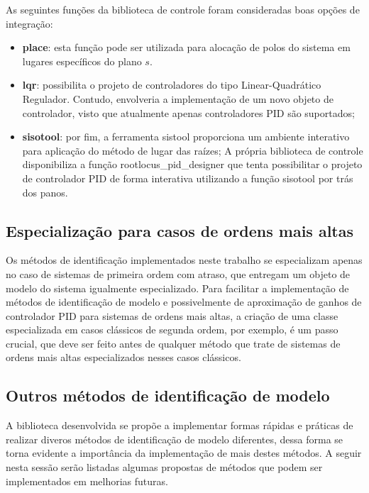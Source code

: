 As seguintes funções da biblioteca de controle foram consideradas boas opções de integração:
\begin{itemize}
    \item \textbf{place}: esta função pode ser utilizada para alocação de polos do sistema em lugares específicos do plano $s$.
    \item \textbf{lqr}: possibilita o projeto de controladores do tipo Linear-Quadrático Regulador.
    Contudo, envolveria a implementação de um novo objeto de controlador, visto que atualmente apenas controladores PID
    são suportados;
    \item \textbf{sisotool}: por fim, a ferramenta sistool proporciona um ambiente interativo para aplicação do método
    de lugar das raízes;
    A própria biblioteca de controle disponibiliza a função rootlocus\_pid\_designer que tenta possibilitar o projeto
    de controlador PID de forma interativa utilizando a função sisotool por trás dos panos.
\end{itemize}


\subsection{Especialização para casos de ordens mais altas}
Os métodos de identificação implementados neste trabalho se especializam apenas no caso de sistemas de primeira ordem
com atraso, que entregam um objeto de modelo do sistema igualmente especializado.
Para facilitar a implementação de métodos de identificação de modelo e possivelmente de aproximação de ganhos de
controlador PID para sistemas de ordens mais altas, a criação de uma classe especializada em casos clássicos de
segunda ordem, por exemplo, é um passo crucial, que deve ser feito antes de qualquer método que trate de sistemas
de ordens mais altas especializados nesses casos clássicos.

\subsection{Outros métodos de identificação de modelo}\label{subsec:outros-metodos-de-identificacao-de-modelo}
A biblioteca desenvolvida se propõe a implementar formas rápidas e práticas de realizar diveros métodos de identificação
de modelo diferentes, dessa forma se torna evidente a importância da implementação de mais destes métodos.
A seguir nesta sessão serão listadas algumas propostas de métodos que podem ser implementados em melhorias futuras.

